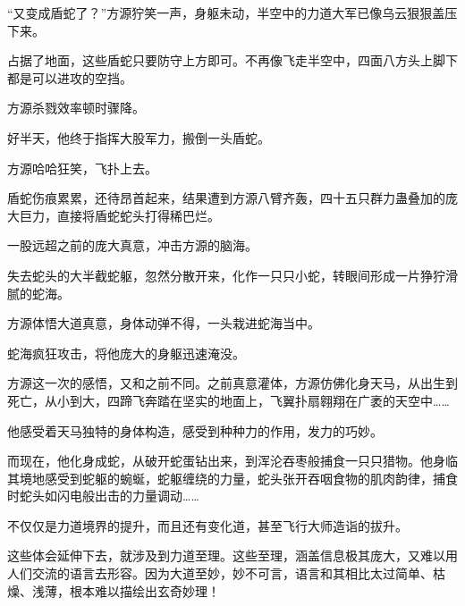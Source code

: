 \begin{this_body}
“又变成盾蛇了？”方源狞笑一声，身躯未动，半空中的力道大军已像乌云狠狠盖压下来。

占据了地面，这些盾蛇只要防守上方即可。不再像飞走半空中，四面八方头上脚下都是可以进攻的空挡。

方源杀戮效率顿时骤降。

好半天，他终于指挥大股军力，搬倒一头盾蛇。

方源哈哈狂笑，飞扑上去。

盾蛇伤痕累累，还待昂首起来，结果遭到方源八臂齐轰，四十五只群力蛊叠加的庞大巨力，直接将盾蛇蛇头打得稀巴烂。

一股远超之前的庞大真意，冲击方源的脑海。

失去蛇头的大半截蛇躯，忽然分散开来，化作一只只小蛇，转眼间形成一片狰狞滑腻的蛇海。

方源体悟大道真意，身体动弹不得，一头栽进蛇海当中。

蛇海疯狂攻击，将他庞大的身躯迅速淹没。

方源这一次的感悟，又和之前不同。之前真意灌体，方源仿佛化身天马，从出生到死亡，从小到大，四蹄飞奔踏在坚实的地面上，飞翼扑扇翱翔在广袤的天空中……

他感受着天马独特的身体构造，感受到种种力的作用，发力的巧妙。

而现在，他化身成蛇，从破开蛇蛋钻出来，到浑沦吞枣般捕食一只只猎物。他身临其境地感受到蛇躯的蜿蜒，蛇躯缠绕的力量，蛇头张开吞咽食物的肌肉韵律，捕食时蛇头如闪电般出击的力量调动……

不仅仅是力道境界的提升，而且还有变化道，甚至飞行大师造诣的拔升。

这些体会延伸下去，就涉及到力道至理。这些至理，涵盖信息极其庞大，又难以用人们交流的语言去形容。因为大道至妙，妙不可言，语言和其相比太过简单、枯燥、浅薄，根本难以描绘出玄奇妙理！

\end{this_body}

